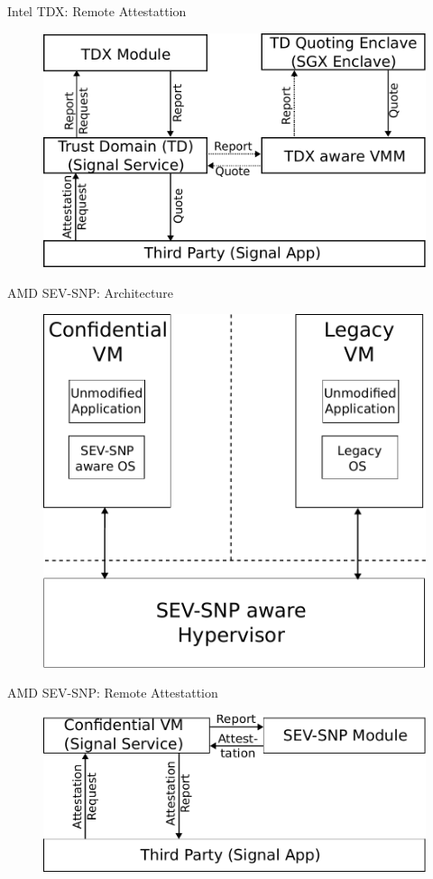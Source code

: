 \documentclass[aspectratio=169]{beamer}
\begin{document}
\begin{frame}{Intel TDX: Remote Attestattion}
    \begin{figure}
        \includegraphics[width=.6\textwidth]{images/tdx_remote_attestation.pdf}
    \end{figure}
\end{frame}
\begin{frame}{AMD SEV-SNP: Architecture}
    \begin{figure}
        \includegraphics[width=.5\textwidth]{images/sev-snp_components.pdf}
    \end{figure}
\end{frame}
\begin{frame}{AMD SEV-SNP: Remote Attestattion}
    \begin{figure}
        \includegraphics[width=.6\textwidth]{images/sev-snp_remote_attestation.pdf}
    \end{figure}
\end{frame}
\end{document}
